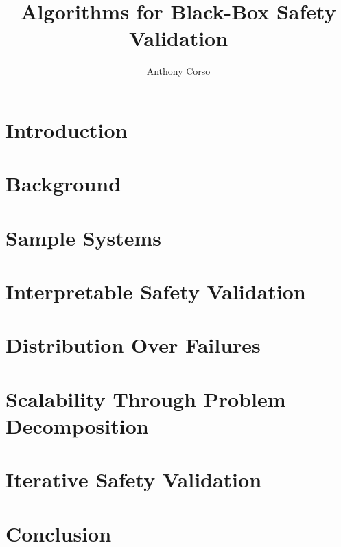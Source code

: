 \documentclass[12pt,letterpaper]{report}
\title{Algorithms for Black-Box Safety Validation}
\author{Anthony Corso}
\begin{document}
\beforepreface





\afterpreface

\chapter{Introduction}


\chapter{Background}
\label{ch2}


\chapter{Sample Systems}
\label{ch3}


\chapter{Interpretable Safety Validation}
\label{ch4}


\chapter{Distribution Over Failures}
\label{ch5}


\chapter{Scalability Through Problem \\Decomposition}
\label{ch6}


\chapter{Iterative Safety Validation}
\label{ch7}


\chapter{Conclusion}


\printbibliography
\end{document}
